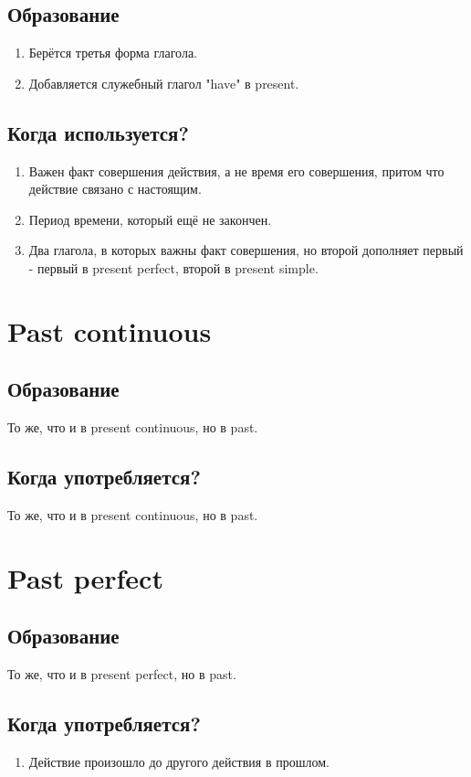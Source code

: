 \documentclass[oneside]{book}
\begin{document}
	\subsection{Образование}
	\begin{enumerate}
		\item Берётся третья форма глагола.
		\item Добавляется служебный глагол "have" в present.
	\end{enumerate}

	\subsection{Когда используется?}
	\begin{enumerate}
		\item Важен факт совершения действия, а не время его совершения, притом что действие связано с настоящим.
		\item Период времени, который ещё не закончен.
		\item Два глагола, в которых важны факт совершения, но второй дополняет первый -
		первый в present perfect, второй в present simple.
	\end{enumerate}

	\section{Past continuous}
	\subsection{Образование}
	То же, что и в present continuous, но в past.
	\subsection{Когда употребляется?}
	То же, что и в present continuous, но в past.

	\section{Past perfect}
	\subsection{Образование}
	То же, что и в present perfect, но в past.

	\subsection{Когда употребляется?}
	\begin{enumerate}
		\item Действие произошло до другого действия в прошлом.
	\end{enumerate}
\end{document}
